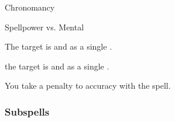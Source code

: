 \newpage
\begin{spellsection}{Chronomancy}

\begin{spellheader}
\end{spellheader}

\begin{spellcontent}

\begin{spelltargetinginfo}




\end{spelltargetinginfo}


\begin{spelleffects}




\begin{spellattack}{Spellpower vs. Mental}


\spellsuccess
The target is  and  as a single .



\spellcritical
the target is  and  as a single .



\end{spellattack}





\end{spelleffects}

\end{spellcontent}
\begin{spellfooter}


\end{spellfooter}
\begin{spellsubcontent}


\begin{spellcantrip}

You take a  penalty to accuracy with the spell.

\end{spellcantrip}


\end{spellsubcontent}
\end{spellsection}


\subsubsection{Subspells}


